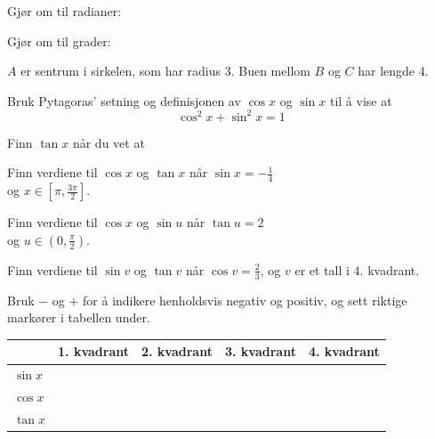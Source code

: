 





\opgt

Gjør om til radianer:\os
{}


Gjør om til grader:\os
{}

$A$ er sentrum i sirkelen, som har radius 3. Buen mellom $B$ og $C$ har lengde 4.

\nes
{}
Bruk Pytagoras' setning og definisjonen av $ \cos x $ og $ \sin x $ til å vise at
\[ \cos^2 x + \sin^2 x = 1 \] 

Finn $\tan x $ når du vet at\os
{}

Finn verdiene til $\cos x$ og $\tan x$ når ${\sin x=-\frac{1}{4}}$\\  og $x\in\left[\pi, \frac{3\pi}{2}\right]$.

Finn verdiene til $\cos x$ og $\sin u$ når $\tan u=2$ \\ og $u\in\left(0, \frac{\pi}{2}\right)$.

Finn verdiene til $\sin v$ og $\tan v$ når $\cos v=\frac{2}{3}$, og $v$ er et tall i $4.$ kvadrant.



\newpage
{}
Bruk $ - $ og $ + $ for å indikere henholdsvis negativ og positiv, og sett riktige markører i tabellen under.
\begin{center}
	\begin{tabular}{@{}l|l| l| l|l|}
		&1. kvadrant & 2. kvadrant & 3. kvadrant & 4. kvadrant\\ \hline
		$ \sin x $& & & &\\ \hline
		$ \cos x $& & & &\\ \hline
		$ \tan x $& & & &\\\hline
	\end{tabular}
\end{center}

